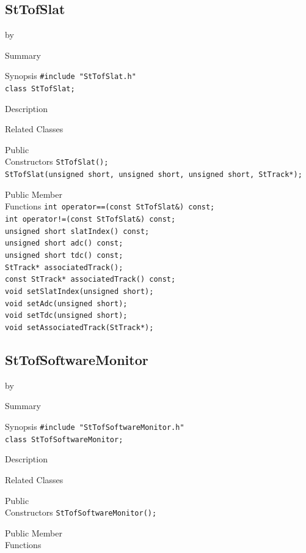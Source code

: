 \documentclass[twoside]{article}
\newcommand{\entrylabel}[1]{\mbox{\textbf{{#1}}}\hfil}%
\newenvironment{entry}
{\begin{list}{}%
    {\renewcommand{\makelabel}{\entrylabel}%
     \setlength{\labelwidth}{90pt}%
     \setlength{\leftmargin}{\labelwidth}
     \advance\leftmargin by \labelsep%
      }%
    }%
  {\end{list}}
\newcommand{\Entrylabel}[1]%
{\raisebox{0pt}[1ex][0pt]{\makebox[\labelwidth][l]%
    {\parbox[t]{\labelwidth}{\hspace{0pt}\textbf{{#1}}}}}}
\newenvironment{Entry}%
{\renewcommand{\entrylabel}{\Entrylabel}\begin{entry}}%
  {\end{entry}}
\begin{document}
\subsection{StTofSlat}
\label{sec:StTofSlat}
\begin{Entry}
\item[Summary]
\item[Synopsis]
    \verb+#include "StTofSlat.h"+\\
    \verb+class StTofSlat;+\\
\item[Description]
\item[Related Classes]
\item[Public\\ Constructors]
    \verb+StTofSlat();+\\
    \verb+StTofSlat(unsigned short, unsigned short, unsigned short, StTrack*);+\\
\item[Public Member\\ Functions]
    \verb+int operator==(const StTofSlat&) const;+\\
    \verb+int operator!=(const StTofSlat&) const;+\\
    \verb+unsigned short slatIndex() const;+\\
    \verb+unsigned short adc() const;+\\
    \verb+unsigned short tdc() const;+\\
    \verb+StTrack* associatedTrack();+\\
    \verb+const StTrack* associatedTrack() const;+\\
    \verb+void setSlatIndex(unsigned short);+\\
    \verb+void setAdc(unsigned short);+\\
    \verb+void setTdc(unsigned short);+\\
    \verb+void setAssociatedTrack(StTrack*);+\\
\end{Entry}
\clearpage

\subsection{StTofSoftwareMonitor}
\label{sec:StTofSoftwareMonitor}
\begin{Entry}
\item[Summary]
\item[Synopsis]
    \verb+#include "StTofSoftwareMonitor.h"+\\
    \verb+class StTofSoftwareMonitor;+\\
\item[Description]
\item[Related Classes]
\item[Public\\ Constructors]
    \verb+StTofSoftwareMonitor();+\\
\item[Public Member\\ Functions]
\end{Entry}
\clearpage
\end{document}
